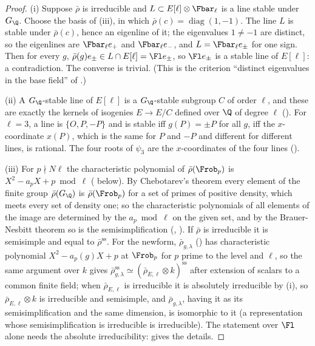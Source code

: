 \begin{proof}
(i) Suppose $\bar\rho$ is irreducible and $L\subset E[\ell]\otimes\Fbar_\ell$ is a line stable under $G_\Q$. Choose the basis of
(iii), in which $\bar\rho(c)=\operatorname{diag}(1,-1)$. The line $L$ is stable under $\bar\rho(c)$, hence an eigenline of it;
the eigenvalues $1\ne-1$ are distinct, so the eigenlines are $\Fbar_\ell e_+$ and $\Fbar_\ell e_-$, and $L=\Fbar_\ell e_\pm$ for one sign. Then for every $g$,
$\bar\rho(g)e_\pm\in L\cap E[\ell]=\Fl e_\pm$, so $\Fl e_\pm$ is a stable line of $E[\ell]$: a contradiction. The converse is trivial. (This is the
criterion ``distinct eigenvalues in the base field'' of .)

(ii) A $G_\Q$-stable line of $E[\ell]$ is a $G_\Q$-stable subgroup $C$ of order $\ell$, and these are exactly the kernels of isogenies $E\to E/C$
defined over $\Q$ of degree $\ell$ (). For $\ell=3$, a line is $\{O,P,-P\}$ and is stable iff $g(P)=\pm P$ for all $g$, iff the
$x$-coordinate $x(P)$, which is the same for $P$ and $-P$ and different for different lines, is rational. The four roots of $\psi_3$ are the
$x$-coordinates of the four lines ().

(iii) For $p\nmid N\ell$ the characteristic polynomial of $\bar\rho(\Frob_p)$ is $X^2-a_pX+p\bmod\ell$ ( below). By
Chebotarev's theorem every element of the finite group $\bar\rho(G_\Q)$ is $\bar\rho(\Frob_p)$ for a set of primes of positive density, which meets every
set of density one; so the characteristic polynomials of all elements of the image are determined by the $a_p\bmod\ell$ on the given set,
and by the Brauer-Nesbitt theorem so is the semisimplification (, ). If $\bar\rho$ is irreducible it is
semisimple and equal to $\bar\rho^{\mathrm{ss}}$. For the newform, $\bar\rho_{g,\lambda}$ () has characteristic polynomial $X^2-a_p(g)X+p$ at
$\Frob_p$ for $p$ prime to the level and $\ell$, so the same argument over $k$ gives $\bar\rho_{g,\lambda}^{\mathrm{ss}}\simeq(\bar\rho_{E,\ell}\otimes k)^{\mathrm{ss}}$
after extension of scalars to a common finite field; when $\bar\rho_{E,\ell}$ is irreducible it is absolutely irreducible by (i), so
$\bar\rho_{E,\ell}\otimes k$ is irreducible and semisimple, and $\bar\rho_{g,\lambda}$, having it as its semisimplification and the same dimension, is isomorphic
to it (a representation whose semisimplification is irreducible is irreducible). The statement over $\Fl$ alone needs the absolute
irreducibility:  gives the details.
\end{proof}

